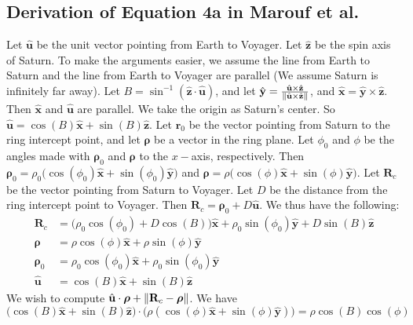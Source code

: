 \documentclass[oneside]{book}
\theoremstyle{mystyle}
\DeclarePairedDelimiter\norm{\lVert}{\rVert}
\begin{document}
\subsection{Derivation of Equation 4a in Marouf et al.}
Let $\hat{\mathbf{u}}$ be the unit vector pointing from Earth to Voyager. Let $\hat{\mathbf{z}}$ be the spin axis of Saturn. To make the arguments easier, we assume the line from Earth to Saturn and the line from Earth to Voyager are parallel (We assume Saturn is infinitely far away). Let $B = \sin^{-1}(\hat{\mathbf{z}}\cdot \hat{\mathbf{u}})$, and let $\hat{\mathbf{y}} = \frac{\hat{\mathbf{u}}\times \hat{\mathbf{z}}}{\norm{\hat{\mathbf{u}}\times \hat{\mathbf{z}}}}$, and $\hat{\mathbf{x}} = \hat{\mathbf{y}}\times \hat{\mathbf{z}}$. Then $\hat{\mathbf{x}}$ and $\hat{\mathbf{u}}$ are parallel. We take the origin as Saturn's center. So $\hat{\mathbf{u}} = \cos(B)\hat{\mathbf{x}}+\sin(B)\hat{\mathbf{z}}$. Let $\mathbf{r}_{0}$ be the vector pointing from Saturn to the ring intercept point, and let $\boldsymbol{\rho}$ be a vector in the ring plane. Let $\phi_0$ and $\phi$ be the angles made with $\boldsymbol{\rho}_0$ and $\boldsymbol{\rho}$ to the $x-$axis, respectively. Then $\boldsymbol{\rho}_{0} = \rho_{0}\big(\cos(\phi_0)\hat{\mathbf{x}}+\sin(\phi_{0})\hat{\mathbf{y}}\big)$ and $\boldsymbol{\rho} = \rho\big(\cos(\phi)\hat{\mathbf{x}}+\sin(\phi)\hat{\mathbf{y}}\big)$. Let $\mathbf{R}_{c}$ be the vector pointing from Saturn to Voyager. Let $D$ be the distance from the ring intercept point to Voyager. Then $\mathbf{R}_{c} = \boldsymbol{\rho}_{0}+D\hat{\mathbf{u}}$. We thus have the following:
\begin{align*}
\mathbf{R}_{c} &= \big(\rho_{0}\cos(\phi_0)+D\cos(B)\big)\hat{\mathbf{x}}+\rho_{0}\sin(\phi_{0})\hat{\mathbf{y}}+D\sin(B)\hat{\mathbf{z}}\\
\boldsymbol{\rho} &= \rho\cos(\phi)\hat{\mathbf{x}}+\rho\sin(\phi)\hat{\mathbf{y}}\\
\boldsymbol{\rho}_{0} &= \rho_{0}\cos(\phi_0)\hat{\mathbf{x}}+\rho_{0}\sin(\phi_{0})\hat{\mathbf{y}}\\
\hat{\mathbf{u}} &= \cos(B)\hat{\mathbf{x}}+\sin(B)\hat{\mathbf{z}}
\end{align*}
We wish to compute $\hat{\mathbf{u}}\cdot \boldsymbol{\rho}+\norm{\mathbf{R}_{c}-\boldsymbol{\rho}}$. We have
\begin{equation*}
\big(\cos(B)\hat{\mathbf{x}}+\sin(B)\hat{\mathbf{z}}\big)\cdot\big(\rho(\cos(\phi)\hat{\mathbf{x}}+\sin(\phi)\hat{\mathbf{y}})\big) = \rho\cos(B)\cos(\phi)
\end{equation*}
\end{document}
